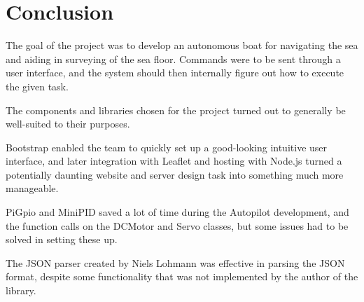 \chapter{Conclusion}
The goal of the project was to develop an autonomous boat for navigating the sea and aiding in surveying of the sea floor. Commands were to be sent through a user interface, and the system should then internally figure out how to execute the given task. 

The components and libraries chosen for the project turned out to generally be well-suited to their purposes. 

Bootstrap enabled the team to quickly set up a good-looking intuitive user interface, and later integration with Leaflet and hosting with Node.js turned a potentially daunting website and server design task into something much more manageable. 

PiGpio and MiniPID saved a lot of time during the Autopilot development, and the function calls on the DCMotor and Servo classes, but some issues had to be solved in setting these up. 

The JSON parser created by Niels Lohmann was effective in parsing the JSON format, despite some functionality that was not implemented by the author of the library. 

